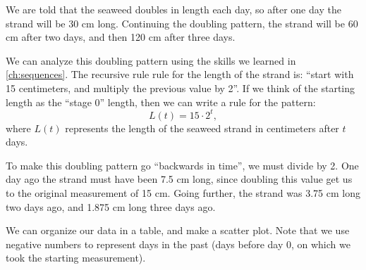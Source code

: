 
We are told that the seaweed doubles in length each day, so after one day the strand will be 30 cm long. Continuing the doubling pattern, the strand will be 60 cm after two days, and then 120 cm after three days.

We can analyze this doubling pattern using the skills we learned in \cref{ch:sequences}. The recursive rule rule for the length of the strand is: ``start with 15 centimeters, and multiply the previous value by 2''. If we think of the starting length as the ``stage 0'' length, then we can write a rule for the pattern:
\[L(t) = 15 \cdot 2^t,\]
where $L(t)$ represents the length of the seaweed strand in centimeters after $t$ days.

To make this doubling pattern go ``backwards in time'', we must divide by 2. One day ago the strand must have been 7.5 cm long, since doubling this value get us to the original measurement of 15 cm. Going further, the strand was 3.75 cm long two days ago, and 1.875 cm long three days ago.

We can organize our data in a table, and make a scatter plot. Note that we use negative numbers to represent days in the past (days before day 0, on which we took the starting measurement).

